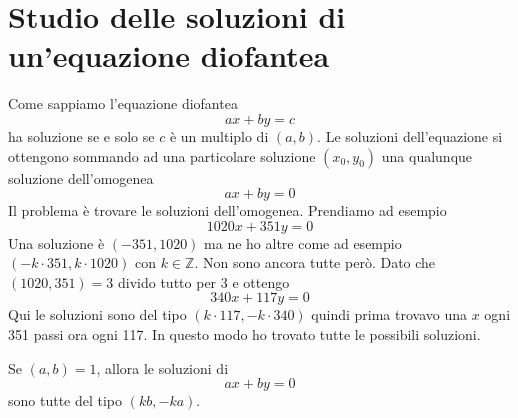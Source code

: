 \section{Studio delle soluzioni di un'equazione diofantea}
Come sappiamo l'equazione diofantea
\begin{equation*}
	ax + by = c
\end{equation*}
ha soluzione se e solo se $c$ \`e un multiplo di $(a, b)$. Le soluzioni dell'equazione si
ottengono sommando ad una particolare soluzione $(x_0, y_0)$ una qualunque soluzione
dell'omogenea
\begin{equation*}
	ax + by = 0
\end{equation*}
Il problema \`e trovare le soluzioni dell'omogenea.
Prendiamo ad esempio
\begin{equation*}
	1020x + 351y = 0
\end{equation*}
Una soluzione \`e $(-351, 1020)$ ma ne ho altre come ad esempio $(-k \cdot 351, k \cdot 1020)$
con $k \in \mathbb{Z}$.
Non sono ancora tutte per\`o. Dato che $(1020, 351) = 3$ divido tutto per 3 e ottengo
\begin{equation*}
	340x + 117y = 0
\end{equation*}
Qui le soluzioni sono del tipo $(k \cdot 117, -k \cdot 340)$ quindi prima trovavo una $x$ ogni
351 passi ora ogni 117. In questo modo ho trovato tutte le possibili soluzioni.

\begin{theorem}
	Se $(a, b) = 1$, allora le soluzioni di
	\begin{equation*}
		ax + by = 0
	\end{equation*}
	sono tutte del tipo $(kb, -ka)$.
\end{theorem}
